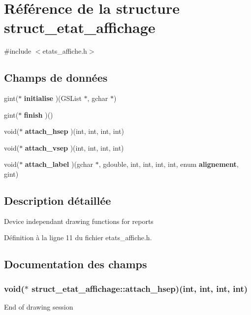 \section{Référence de la structure struct\_\-etat\_\-affichage}
\label{structstruct__etat__affichage}


{\ttfamily \#include $<$etats\_\-affiche.h$>$}

\subsection*{Champs de données}
\begin{DoxyCompactItemize}
\item 
gint($\ast$ {\bf initialise} )(GSList $\ast$, gchar $\ast$)
\item 
gint($\ast$ {\bf finish} )()
\item 
void($\ast$ {\bf attach\_\-hsep} )(int, int, int, int)
\item 
void($\ast$ {\bf attach\_\-vsep} )(int, int, int, int)
\item 
void($\ast$ {\bf attach\_\-label} )(gchar $\ast$, gdouble, int, int, int, int, enum {\bf alignement}, gint)
\end{DoxyCompactItemize}


\subsection{Description détaillée}
Device independant drawing functions for reports 

Définition à la ligne 11 du fichier etats\_\-affiche.h.



\subsection{Documentation des champs}
\subsubsection[{attach\_\-hsep}]{\setlength{\rightskip}{0pt plus 5cm}void($\ast$  {\bf struct\_\-etat\_\-affichage::attach\_\-hsep})(int, int, int, int)}\label{structstruct__etat__affichage_a02830ad84d15fdfacde3e711715bd0e0}
End of drawing session 

